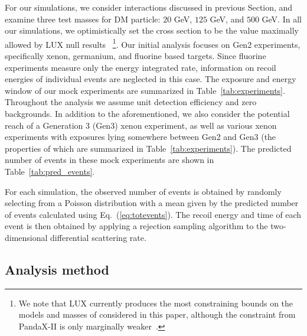 \documentclass[11pt]{article}
\newcommand{\Eq}[1]{Eq.~(\ref{#1})} \newcommand{\Eqs}[2]{Eqs.~(\ref{#1}) and (\ref{#2})} \newcommand{\Eqm}[2]{Eqs.~(\ref{#1}) through (\ref{#2})}
\begin{document}
For our simulations, we consider interactions discussed in previous Section, and examine three test masses for DM particle: $20$ GeV, $125$ GeV, and $500$ GeV. In all our simulations, we optimistically set the cross section to be the value maximally allowed by LUX null results~\cite{Akerib:2016vxi} \footnote{We note that LUX currently produces the most constraining bounds on the models and masses of considered in this paper, although the constraint from PandaX-II is only marginally weaker~\cite{Tan:2016zwf}.}. Our initial analysis focuses on Gen2 experiments, specifically xenon, germanium, and fluorine based targets. Since fluorine experiments measure only the energy integrated rate, information on recoil energies of individual events are neglected in this case.  The exposure and energy window of our mock experiments are summarized in Table~\ref{tab:experiments}. Throughout the analysis we assume unit detection efficiency and zero backgrounds. In addition to the aforementioned, we also consider the potential reach of a Generation 3 (Gen3) xenon experiment, as well as various xenon experiments with exposures lying somewhere between Gen2 and Gen3 (the properties of which are summarized in Table~\ref{tab:experiments}).  The predicted number of events in these mock experiments are shown in Table~\ref{tab:pred_events}. 

For each simulation, the observed number of events is obtained by randomly selecting from a Poisson distribution with a mean given by the predicted number of events calculated using \Eq{eq:totevents}. The recoil energy and time of each event is then obtained by applying a rejection sampling algorithm to the two-dimensional differential scattering rate. 

\subsection{Analysis method}\label{sec:stats}
\end{document}
